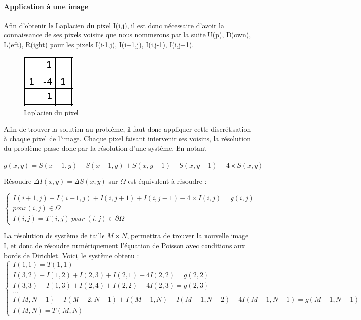 \paragraph{Application à une image }
Afin d'obtenir le Laplacien du pixel I(i,j), il est donc nécessaire d'avoir la connaissance de ses pixels voisins que nous nommerons par la suite U(p), D(own), L(eft), R(ight) pour les pixels I(i-1,j), I(i+1,j), I(i,j-1), I(i,j+1). 

\begin{figure}
\centering
    \includegraphics[scale = 0.8]{Images/Laplacian.png}
    \caption{Laplacien du pixel}
\end{figure}
Afin de trouver la solution au problème, il faut donc appliquer cette discrétisation à chaque pixel de l'image. Chaque pixel faisant intervenir ses voisins, la résolution du problème passe donc par la résolution d'une système.
En notant
\begin{center}
 $g(x,y) = S(x+1,y) + S(x-1,y)+ S(x,y+1) + S(x,y-1) - 4\times S(x,y)$\\
 \end{center}
Résoudre $\Delta I(x,y) = \Delta S(x,y)$ sur $\Omega$ est équivalent à résoudre :\\
\begin{center}
\begin{equation*}
    \left \{
    \begin{aligned}
    I(i+1,j) + I(i-1,j)+ I(i,j+1) + I(i, j-1) - 4\times 			I(i,j)= g(i,j)\\ pour (i,j)\in \Omega \\
    I(i,j) = T(i,j) \ pour \ (i,j) \in \partial \Omega
    \end{aligned}
    \right.
\end{equation*}
\end{center}
La résolution de système de taille $M\times N $, permettra de trouver la nouvelle image I, et donc de résoudre numériquement l'équation de Poisson avec conditions aux bords de Dirichlet. Voici, le système obtenu : 
\begin{equation}
\left\{
\begin{aligned}
I(1,1) = T(1,1)\\
I(3,2)+I(1,2)+ I(2,3)+I(2,1)-4I(2,2) =g(2,2) \\
I(3,3)+I(1,3)+ I(2,4)+I(2,2)-4I(2,3) =g(2,3)             \\
... \\
I(M,N-1)+I(M-2,N-1)+ I(M-1,N)+I(M-1,N-2)-4I(M-1,N-1) =g(M-1,N-1)\\
I(M, N) = T(M, N)
\end{aligned}
\right.
\end{equation}
